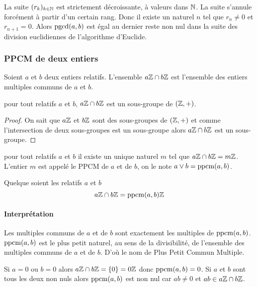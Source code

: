 La suite \((r_k)_{k \in \mathbb{N}}\) est strictement décroissante, à valeurs dans 
\(\mathbb{N}\). La suite s'annule forcément à partir d'un certain rang. Donc il existe 
un naturel \(n\) tel que \(r_n \neq 0\) et \(r_{n+1}=0\). Alors \(\operatorname{pgcd}(a,b)\) 
est égal au dernier reste non nul dans la suite des division euclidiennes de 
l'algorithme d'Euclide.

\subsubsection{PPCM de deux entiers}

Soient \(a\) et \(b\) deux entiers relatifs. L'ensemble \(a\mathbb{Z} \cap b\mathbb{Z}\) est 
l'ensemble des entiers multiples communs de \(a\) et \(b\).
\begin{theo}
  pour tout relatifs \(a\) et \(b\), \(a\mathbb{Z} \cap b\mathbb{Z}\) est un sous-groupe de 
  \((\mathbb{Z},+)\).
\end{theo}
\begin{proof}
  On sait que \(a\mathbb{Z}\) et \(b\mathbb{Z}\) sont des sous-groupes de \((\mathbb{Z},+)\) et comme 
  l'intersection de deux sous-groupes est un sous-groupe alors \(a\mathbb{Z} \cap b\mathbb{Z}\) 
  est un sous-groupe.
\end{proof}
\begin{corth}
  pour tout relatifs \(a\) et \(b\) il existe un unique naturel \(m\) tel que 
  \(a\mathbb{Z} \cap b\mathbb{Z}= m \mathbb{Z}\). L'entier \(m\) est appelé le PPCM de \(a\) et de 
  \(b\), on le note \(a \vee b = \operatorname{ppcm}(a,b)\).
\end{corth}
\begin{theo}
  Quelque soient les relatifs \(a\) et \(b\)
  \begin{equation}
    a\mathbb{Z} \cap b\mathbb{Z} = \operatorname{ppcm}(a,b) \mathbb{Z}
  \end{equation}
\end{theo}

\paragraph{Interprétation}

Les multiples communs de \(a\) et de \(b\) sont exactement les multiples de 
\(\operatorname{ppcm}(a,b)\). \(\operatorname{ppcm}(a,b)\) est le plus petit naturel, au sens de la 
divisibilité, de l'ensemble des multiples communs de \(a\) et de \(b\). D'où le 
nom de Plus Petit Commun Multiple.

Si \(a=0\) ou \(b=0\) alors \(a\mathbb{Z} \cap b\mathbb{Z} = \{0\}=0\mathbb{Z}\) donc \(\operatorname{ppcm}(a,b)=0\). 
Si \(a\) et \(b\) sont tous les deux non nuls alors \(\operatorname{ppcm}(a,b)\) est non nul 
car \(ab \neq 0\) et \(ab \in a\mathbb{Z} \cap b\mathbb{Z}\).

